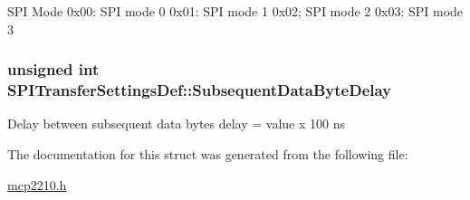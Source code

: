 \-S\-P\-I \-Mode 0x00\-: \-S\-P\-I mode 0 0x01\-: \-S\-P\-I mode 1 0x02; \-S\-P\-I mode 2 0x03\-: \-S\-P\-I mode 3 \hypertarget{struct_s_p_i_transfer_settings_def_a7692386eb70c3fd674c1a0fdbe7a62c2}{
\subsubsection[{\-Subsequent\-Data\-Byte\-Delay}]{\setlength{\rightskip}{0pt plus 5cm}unsigned int {\bf \-S\-P\-I\-Transfer\-Settings\-Def\-::\-Subsequent\-Data\-Byte\-Delay}}}\label{struct_s_p_i_transfer_settings_def_a7692386eb70c3fd674c1a0fdbe7a62c2}
\-Delay between subsequent data bytes delay = value x 100 ns 

\-The documentation for this struct was generated from the following file\-:\begin{DoxyCompactItemize}
\item 
\hyperlink{mcp2210_8h}{mcp2210.\-h}\end{DoxyCompactItemize}
